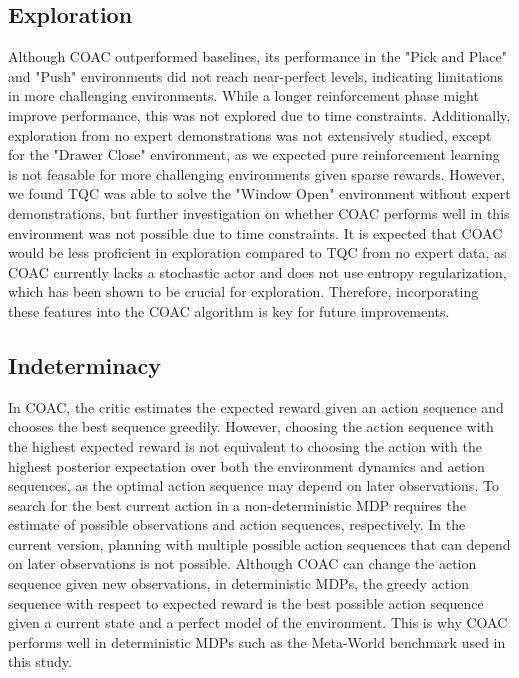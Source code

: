 \subsection{Exploration}
Although COAC outperformed baselines, its performance in the "Pick and Place" and "Push" environments did not reach near-perfect levels, 
indicating limitations in more challenging environments. While a longer reinforcement phase might improve performance, this was not explored 
due to time constraints. Additionally, exploration from no expert demonstrations was not extensively studied, except for the "Drawer Close" 
environment, as we expected pure reinforcement learning is not feasable for more challenging environments given sparse rewards. 
However, we found TQC was able to solve the "Window Open" environment without expert demonstrations, but further investigation on whether 
COAC performs well in this environment was not possible due to time constraints. It is expected that COAC would be less proficient in exploration 
compared to TQC from no expert data, as COAC currently lacks a stochastic actor and does not use entropy regularization, which has been shown to 
be crucial for exploration. Therefore, incorporating these features into the COAC algorithm is key for future improvements.

\subsection{Indeterminacy}
In COAC, the critic estimates the expected reward given an action sequence and chooses the best sequence greedily. 
However, choosing the action sequence with the highest expected reward is not equivalent to choosing the action with the highest posterior 
expectation over both the environment dynamics and action sequences, as the optimal action sequence may depend on later observations. To 
search for the best current action in a non-deterministic MDP requires the estimate of possible observations and action sequences, respectively. 
In the current version, planning with multiple possible action sequences that can depend on later observations is not possible. 
Although COAC can change the action sequence given new observations, in deterministic MDPs, the greedy action sequence with respect to expected 
reward is the best possible action sequence given a current state and a perfect model of the environment. This is why COAC performs well in 
deterministic MDPs such as the Meta-World benchmark used in this study.